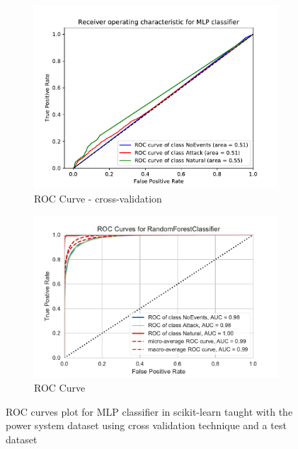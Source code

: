 \begin{figure}[t]
    \centering
    \begin{subfigure}[t]{130mm}
        \centering
        \includegraphics[page=1, width=\linewidth]{images/results_scikit/MLP}
        \caption{ROC Curve - cross-validation}
        \label{fig:scikit_MLP_ROC}
    \end{subfigure}
    \begin{subfigure}[t]{130mm}
        \centering
        \includegraphics[page=3, width=\linewidth]{images/roc_3c}
        \caption{ROC Curve}
        \label{fig:scikit_RF_ROC}
    \end{subfigure}
    \caption{ROC curves plot for MLP classifier in scikit-learn taught with the power system dataset using cross validation technique and a test dataset}
    \label{fig:ROCCM_MLP}
\end{figure}

